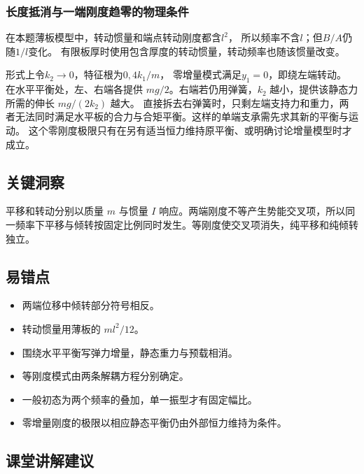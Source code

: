 \documentclass[UTF8,fontset=fandol,a4paper,11pt]{ctexart}
\begin{document}
\subsubsection*{长度抵消与一端刚度趋零的物理条件}
在本题薄板模型中，转动惯量和端点转动刚度都含$l^2$，
所以频率不含$l$；但$B/A$仍随$1/l$变化。
有限板厚时使用包含厚度的转动惯量，转动频率也随该惯量改变。

形式上令$k_2\to0$，特征根为$0,4k_1/m$，
零增量模式满足$y_1=0$，即绕左端转动。
在水平平衡处，左、右端各提供 $mg/2$。右端若仍用弹簧，$k_2$ 越小，提供该静态力所需的伸长 $mg/(2k_2)$ 越大。
直接拆去右弹簧时，只剩左端支持力和重力，两者无法同时满足水平板的合力与合矩平衡。这样的单端支承需先求其新的平衡与运动。
这个零刚度极限只有在另有适当恒力维持原平衡、或明确讨论增量模型时才成立。




\subsection*{关键洞察}

平移和转动分别以质量 $m$ 与惯量 $I$ 响应。两端刚度不等产生势能交叉项，所以同一频率下平移与倾转按固定比例同时发生。等刚度使交叉项消失，纯平移和纯倾转独立。




\subsection*{易错点}

\begin{itemize}
\item 两端位移中倾转部分符号相反。
\item 转动惯量用薄板的 $ml^2/12$。
\item 围绕水平平衡写弹力增量，静态重力与预载相消。
\item 等刚度模式由两条解耦方程分别确定。
\item 一般初态为两个频率的叠加，单一振型才有固定幅比。
\item 零增量刚度的极限以相应静态平衡仍由外部恒力维持为条件。
\end{itemize}




\subsection*{课堂讲解建议}
\end{document}
